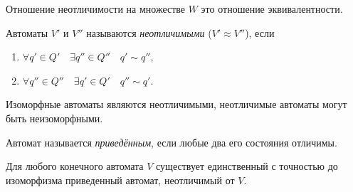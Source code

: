 \begin{remark}
    Отношение неотличимости на множестве $W$ это отношение эквивалентности.
\end{remark}

\begin{definition}
    Автоматы $V'$ и $V''$ называются \textit{неотличимыми} ($V'\approx V''$), если 
    \begin{enumerate}[nolistsep]
        \item $\forall q' \in Q' \quad \exists q'' \in Q'' \quad q' \sim q''$,
        \item $\forall q'' \in Q''\quad \exists q' \in Q' \quad q'' \sim q'$.
    \end{enumerate}
\end{definition}

\begin{remark}
    Изоморфные автоматы являются неотличимыми, неотличимые автоматы могут быть неизоморфными.
\end{remark}

\begin{definition}
    Автомат называется \textit{приведённым}, если любые два его состояния отличимы.
\end{definition}

\begin{theorem}
    Для любого конечного автомата $V$ существует единственный с точностью до изоморфизма приведенный автомат, неотличимый от $V$.
\end{theorem}

